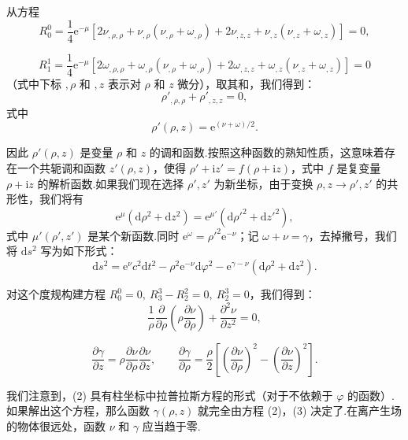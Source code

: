 \begin{xiti}
从方程
\begin{equation*}
  R_0^0=\frac{1}{4}\mathrm{e}^{-\mu}
  \left[2\nu_{,\rho,\rho}+\nu_{,\rho}(\nu_{,\rho}+\omega_{,\rho})
  +2\nu_{,z,z}+\nu_{,z}(\nu_{,z}+\omega_{,z})\right]=0,
\end{equation*}

\begin{equation*}
  R_1^1=\frac{1}{4}\mathrm{e}^{-\mu}
  \left[2\omega_{,\rho,\rho}+\omega_{,\rho}(\nu_{,\rho}+\omega_{,\rho})
  +2\omega_{,z,z}+\omega_{,z}(\nu_{,z}+\omega_{,z})\right]=0
\end{equation*}
（式中下标 $,\rho$ 和 $,z$ 表示对 $\rho$ 和 $z$ 微分），取其和，我们得到：
\begin{equation*}
  \rho'_{,\rho,\rho}+\rho'_{,z,z}=0,
\end{equation*}
式中
\begin{equation*}
  \rho'(\rho,z)=\mathrm{e}^{(\nu+\omega)/2}.
\end{equation*}

因此 $\rho'(\rho,z)$ 是变量 $\rho$ 和 $z$ 的调和函数.按照这种函数的熟知性质，这意味着存在一个共轭调和函数 $z'(\rho,z)$，使得 $\rho'+\mathrm{i}z'=f(\rho+\mathrm{i}z)$，式中 $f$ 是复变量 $\rho+\mathrm{i}z$ 的解析函数.如果我们现在选择 $\rho',z'$ 为新坐标，由于变换 $\rho,z\to\rho',z'$ 的共形性，我们将有
\begin{equation*}
  \mathrm{e}^{\mu}(\mathrm{d}\rho^{2}+\mathrm{d}z^{2})
  =\mathrm{e}^{\mu'}(\mathrm{d}\rho'^{2}+\mathrm{d}z'^{2}),
\end{equation*}
式中 $\mu'(\rho',z')$ 是某个新函数.同时 $\mathrm{e}^{\omega}=\rho'^{2}\mathrm{e}^{-\nu}$；记 $\omega+\nu=\gamma$，去掉撇号，我们将 $\mathrm{d}s^{2}$ 写为如下形式：
\begin{equation}
  \mathrm{d}s^{2}=\mathrm{e}^{\nu}c^{2}\mathrm{d}t^{2}
  -\rho^{2}\mathrm{e}^{-\nu}\mathrm{d}\varphi^{2}
  -\mathrm{e}^{\gamma-\nu}(\mathrm{d}\rho^{2}+\mathrm{d}z^{2}).
  \tag{1}
\end{equation}

对这个度规构建方程 $R_0^0=0,\ R_3^3-R_2^2=0,\ R_2^3=0$，我们得到：
\begin{equation}
  \frac{1}{\rho}\frac{\partial}{\partial\rho}
  \left(\rho\frac{\partial\nu}{\partial\rho}\right)
  +\frac{\partial^{2}\nu}{\partial z^{2}}=0,
  \tag{2}
\end{equation}

\begin{equation}
  \frac{\partial\gamma}{\partial z}
  =\rho\frac{\partial\nu}{\partial\rho}\frac{\partial\nu}{\partial z},
  \qquad
  \frac{\partial\gamma}{\partial\rho}
  =\frac{\rho}{2}\left[\left(\frac{\partial\nu}{\partial\rho}\right)^{2}
  -\left(\frac{\partial\nu}{\partial z}\right)^{2}\right].
  \tag{3}
\end{equation}

我们注意到，(2) 具有柱坐标中拉普拉斯方程的形式（对于不依赖于 $\varphi$ 的函数）.如果解出这个方程，那么函数 $\gamma(\rho,z)$ 就完全由方程 (2)，(3) 决定了.在离产生场的物体很远处，函数 $\nu$ 和 $\gamma$ 应当趋于零.

\end{xiti}
